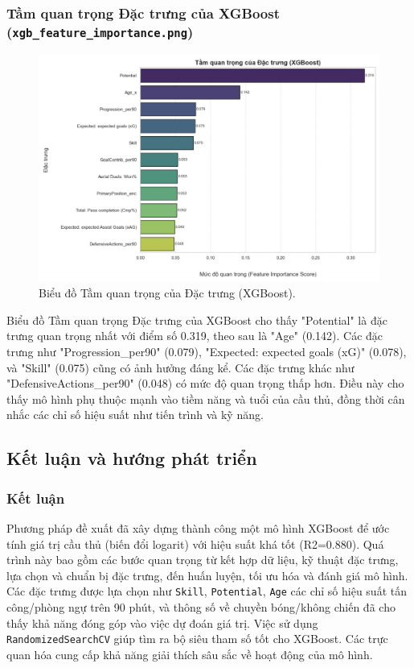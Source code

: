 \documentclass[12pt, a4paper]{report}
\begin{document}
\subsubsection*{Tầm quan trọng Đặc trưng của XGBoost (\texttt{xgb\_feature\_importance.png})}
\begin{figure}[H]
    \centering
    \includegraphics[width=\textwidth]{xgb_feature_importance.png}
    \caption{Biểu đồ Tầm quan trọng của Đặc trưng (XGBoost).}
    \label{fig:xgb_feature_importance}
\end{figure}

Biểu đồ Tầm quan trọng Đặc trưng của XGBoost cho thấy "Potential" là đặc trưng quan trọng nhất với điểm số 0.319, theo sau là "Age" (0.142).
Các đặc trưng như "Progression\_per90" (0.079), "Expected: expected goals (xG)" (0.078), và "Skill" (0.075) cũng có ảnh hưởng đáng kể.
Các đặc trưng khác như "DefensiveActions\_per90" (0.048) có mức độ quan trọng thấp hơn.
Điều này cho thấy mô hình phụ thuộc mạnh vào tiềm năng và tuổi của cầu thủ, đồng thời cân nhắc các chỉ số hiệu suất như tiến trình và kỹ năng.

\subsection{Kết luận và hướng phát triển}
\subsubsection*{Kết luận}
Phương pháp đề xuất đã xây dựng thành công một mô hình XGBoost để ước tính giá trị cầu thủ (biến đổi logarit) với hiệu suất khá tốt (R2=0.880). Quá trình này bao gồm các bước quan trọng từ kết hợp dữ liệu, kỹ thuật đặc trưng, lựa chọn và chuẩn bị đặc trưng, đến huấn luyện, tối ưu hóa và đánh giá mô hình. Các đặc trưng được lựa chọn như \texttt{Skill}, \texttt{Potential}, \texttt{Age} các chỉ số hiệu suất tấn công/phòng ngự trên 90 phút, và thông số về chuyền bóng/không chiến đã cho thấy khả năng đóng góp vào việc dự đoán giá trị. Việc sử dụng \texttt{RandomizedSearchCV} giúp tìm ra bộ siêu tham số tốt cho XGBoost. Các trực quan hóa cung cấp khả năng giải thích sâu sắc về hoạt động của mô hình.
\end{document}
